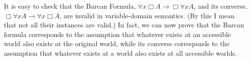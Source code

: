 \begin{solution}
\begin{sollist}
    \item {}
    \medskip
  \end{sollist}
\end{solution}

%
% 
% 
%

It is easy to check that the Barcan Formula,
$\forall x \Box A \to \Box \forall x A$, and its converse,
$\Box \forall x A \to \forall x \Box A$, are invalid in variable-domain
semantics. (By this I mean that not all their instances are valid.) In fact, we
can now prove that the Barcan formula corresponds to the assumption that
whatever exists at an accessible world also exists at the original world, while
its converse corresponds to the assumption that whatever exists at a world also
exists at all accessible worlds.

